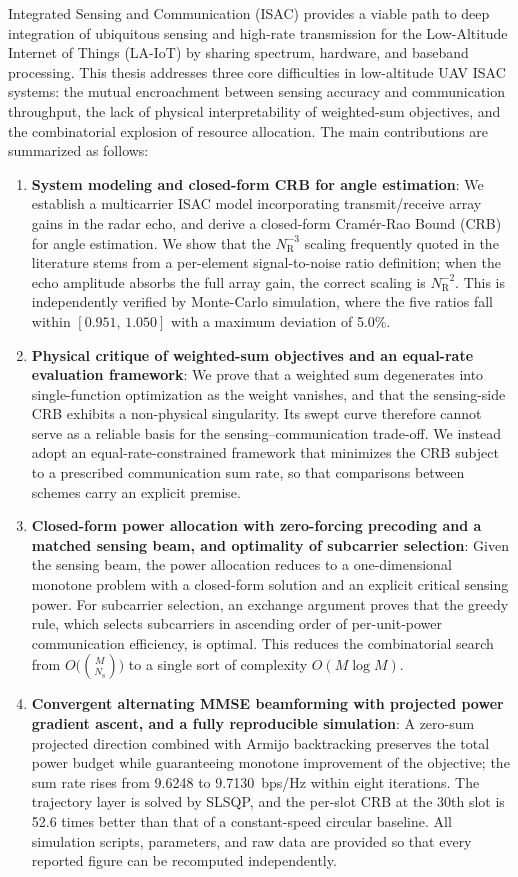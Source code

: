 \documentclass[12pt,a4paper,openany,UTF8]{ctexrep}
\begin{document}
Integrated Sensing and Communication (ISAC) provides a viable path to deep integration of ubiquitous sensing and high-rate transmission for the Low-Altitude Internet of Things (LA-IoT) by sharing spectrum, hardware, and baseband processing. This thesis addresses three core difficulties in low-altitude UAV ISAC systems: the mutual encroachment between sensing accuracy and communication throughput, the lack of physical interpretability of weighted-sum objectives, and the combinatorial explosion of resource allocation. The main contributions are summarized as follows:
\begin{enumerate}
  \item \textbf{System modeling and closed-form CRB for angle estimation}: We establish a multicarrier ISAC model incorporating transmit/receive array gains in the radar echo, and derive a closed-form Cram\'er-Rao Bound (CRB) for angle estimation. We show that the $N_{\mathrm{R}}^{-3}$ scaling frequently quoted in the literature stems from a per-element signal-to-noise ratio definition; when the echo amplitude absorbs the full array gain, the correct scaling is $N_{\mathrm{R}}^{-2}$. This is independently verified by Monte-Carlo simulation, where the five ratios fall within $[0.951,\,1.050]$ with a maximum deviation of 5.0\%.
  \item \textbf{Physical critique of weighted-sum objectives and an equal-rate evaluation framework}: We prove that a weighted sum degenerates into single-function optimization as the weight vanishes, and that the sensing-side CRB exhibits a non-physical singularity. Its swept curve therefore cannot serve as a reliable basis for the sensing--communication trade-off. We instead adopt an equal-rate-constrained framework that minimizes the CRB subject to a prescribed communication sum rate, so that comparisons between schemes carry an explicit premise.
  \item \textbf{Closed-form power allocation with zero-forcing precoding and a matched sensing beam, and optimality of subcarrier selection}: Given the sensing beam, the power allocation reduces to a one-dimensional monotone problem with a closed-form solution and an explicit critical sensing power. For subcarrier selection, an exchange argument proves that the greedy rule, which selects subcarriers in ascending order of per-unit-power communication efficiency, is optimal. This reduces the combinatorial search from $O\bigl(\binom{M}{N_{\mathrm{s}}}\bigr)$ to a single sort of complexity $O(M\log M)$.
  \item \textbf{Convergent alternating MMSE beamforming with projected power gradient ascent, and a fully reproducible simulation}: A zero-sum projected direction combined with Armijo backtracking preserves the total power budget while guaranteeing monotone improvement of the objective; the sum rate rises from 9.6248 to 9.7130~bps/Hz within eight iterations. The trajectory layer is solved by SLSQP, and the per-slot CRB at the 30th slot is 52.6 times better than that of a constant-speed circular baseline. All simulation scripts, parameters, and raw data are provided so that every reported figure can be recomputed independently.
\end{enumerate}
\end{document}
